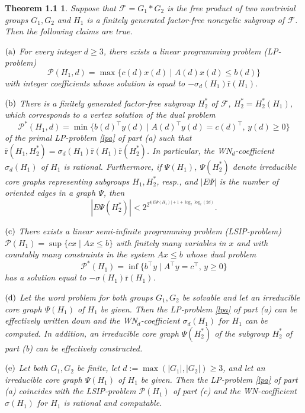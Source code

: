 \documentclass[10pt, reqno]{amsart}
\numberwithin{equation}{section}
\newtheorem*{T1}{Theorem 1.1}
\begin{document}
\begin{T1} Suppose that ${\mathcal{F}} =G_1 * G_2$ is the free product of two nontrivial groups $G_1,  G_2$
and  $H_1$ is a  finitely generated factor-free noncyclic subgroup of ${\mathcal{F}}$. Then the following claims are true.

$\rm{(a)}$ For every integer $d \ge 3$,  there exists a linear programming problem (LP-problem)
\begin{equation*}\tag{1.8}
{\mathcal{P}}(H_1, d) = \max\{ c(d)x(d) \mid A(d)x(d) \le b(d)  \}
\end{equation*}
with integer coefficients whose solution is equal to $-\sigma_d(H_1) {\bar {\mathrm{r}}} (H_1)$.

$\rm{(b)}$  There is a finitely generated factor-free subgroup $H_2^* $ of ${\mathcal{F}}$, $H_2^*= H_2^*(H_1)$,   which corresponds to  a vertex solution of the dual problem
$$
{\mathcal{P}}^*(H_1, d) = \min \{ b(d)^{\top}  y(d)  \mid A(d)^{\top}y(d) = c(d)^{\top} , \, y(d) \ge 0  \}
$$
of the primal LP-problem  \eqref{lpa} of part (a) such that   $\bar {\mathrm{r}}(H_1, H_2^*)  =  \sigma_d(H_1)  \bar {\mathrm{r}}(H_1) \bar {\mathrm{r}}( H_2^*)$. In particular,  the WN${}_d$-coefficient $\sigma_d(H_1)$ of $H_1$ is rational. Furthermore, if $\Psi(H_1)$, $\Psi(H_2^*)$ denote irreducible core graphs representing subgroups $H_1, H_2^*$, resp.,
and $| E \Psi |$ is the number of oriented edges in a graph $\Psi$, then
$$
| E  \Psi(H_2^*) | < 2^{  2^{4| E  \Psi(H_1) | + 1+ \log_2 \log_2 (2d)  } } .
$$

$\rm{(c)}$ There exists a linear semi-infinite programming problem (LSIP-problem) ${\mathcal{P}}(H_1) = \sup \{ cx \mid Ax \le b  \}$ with finitely many variables in $x$ and with countably  many constraints in the system $Ax \le b$ whose dual problem
$$
{\mathcal{P}}^*(H_1)  = \inf \{ b^{\top} y \mid A^{\top} y = c^{\top} , \, y \ge 0  \}
$$
has a solution equal to  $-\sigma(H_1) {\bar {\mathrm{r}}} (H_1)$.

$\rm{(d)}$ Let the word problem for both groups $G_1, G_2$ be solvable
and let an  irreducible core graph $\Psi(H_1)$  of $H_1$ be given. Then the
LP-problem \eqref{lpa}  of part (a)   can be effectively written down and the
WN${}_d$-coefficient $\sigma_d(H_1)$ for $H_1$  can be computed.
In addition,  an irreducible core graph $\Psi(H_2^*)$ of the subgroup $H_2^*$ of part (b) can be effectively constructed.

$\rm{(e)}$ Let both $G_1, G_2$ be finite,  let $d := \max( |G_1|, |G_2|) \ge 3$, and
 let an irreducible  core graph $\Psi(H_1)$  of $H_1$ be given.
 Then the LP-problem \eqref{lpa} of part (a)  coincides with the
LSIP-problem ${\mathcal{P}}(H_1)$ of part (c) and the WN-coefficient $\sigma(H_1)$ for $H_1$ is
rational and computable.
\end{T1}
\end{document}
